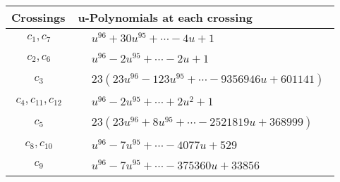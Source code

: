 \documentclass[1p]{elsarticle_modified}
\theoremstyle{definition}
\begin{document}
\begin{tabular}{m{50pt}|m{274pt}}
Crossings & \hspace{64pt}u-Polynomials at each crossing \\
\hline $$\begin{aligned}c_{1},c_{7}\end{aligned}$$&$\begin{aligned}
&u^{96}+30 u^{95}+\cdots-4 u+1
\end{aligned}$\\
\hline $$\begin{aligned}c_{2},c_{6}\end{aligned}$$&$\begin{aligned}
&u^{96}-2 u^{95}+\cdots-2 u+1
\end{aligned}$\\
\hline $$\begin{aligned}c_{3}\end{aligned}$$&$\begin{aligned}
&23(23 u^{96}-123 u^{95}+\cdots-9356946 u+601141)
\end{aligned}$\\
\hline $$\begin{aligned}c_{4},c_{11},c_{12}\end{aligned}$$&$\begin{aligned}
&u^{96}-2 u^{95}+\cdots+2 u^2+1
\end{aligned}$\\
\hline $$\begin{aligned}c_{5}\end{aligned}$$&$\begin{aligned}
&23(23 u^{96}+8 u^{95}+\cdots-2521819 u+368999)
\end{aligned}$\\
\hline $$\begin{aligned}c_{8},c_{10}\end{aligned}$$&$\begin{aligned}
&u^{96}-7 u^{95}+\cdots-4077 u+529
\end{aligned}$\\
\hline $$\begin{aligned}c_{9}\end{aligned}$$&$\begin{aligned}
&u^{96}-7 u^{95}+\cdots-375360 u+33856
\end{aligned}$\\
\hline
\end{tabular}\\~\\
\end{document}

